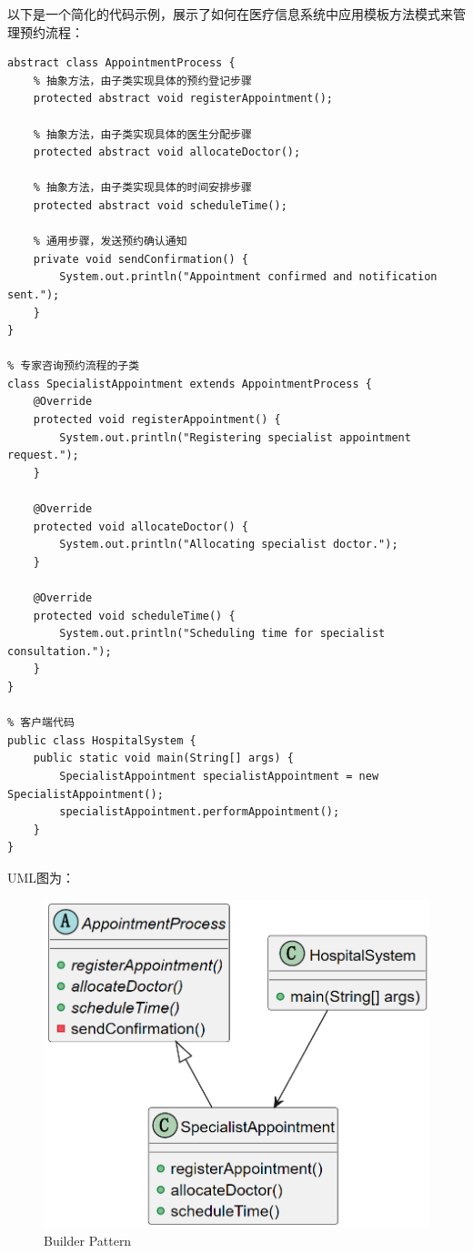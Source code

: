 以下是一个简化的代码示例，展示了如何在医疗信息系统中应用模板方法模式来管理预约流程：
\begin{lstlisting}[caption={模版方法示例}]
% 抽象类：预约流程
abstract class AppointmentProcess {
	% 抽象方法，由子类实现具体的预约登记步骤
	protected abstract void registerAppointment();
	
	% 抽象方法，由子类实现具体的医生分配步骤
	protected abstract void allocateDoctor();
	
	% 抽象方法，由子类实现具体的时间安排步骤
	protected abstract void scheduleTime();
	
	% 通用步骤，发送预约确认通知
	private void sendConfirmation() {
		System.out.println("Appointment confirmed and notification sent.");
	}
}

% 专家咨询预约流程的子类
class SpecialistAppointment extends AppointmentProcess {
	@Override
	protected void registerAppointment() {
		System.out.println("Registering specialist appointment request.");
	}
	
	@Override
	protected void allocateDoctor() {
		System.out.println("Allocating specialist doctor.");
	}
	
	@Override
	protected void scheduleTime() {
		System.out.println("Scheduling time for specialist consultation.");
	}
}

% 客户端代码
public class HospitalSystem {
	public static void main(String[] args) {
		SpecialistAppointment specialistAppointment = new SpecialistAppointment();
		specialistAppointment.performAppointment();
	}
}
\end{lstlisting}
UML图为：
\begin{figure}[htbp]
	\centering
	\includegraphics[width=0.4\textheight]{figures/10.png}
	\caption{Builder Pattern}
\end{figure}

